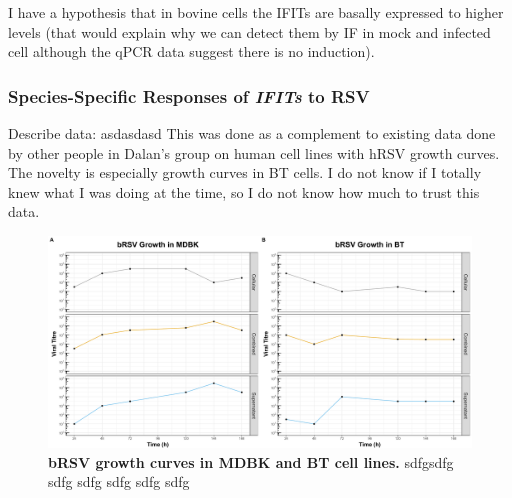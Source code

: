 I have a hypothesis that in bovine cells the IFITs are basally expressed to higher levels  (that would explain why we can detect them by IF in mock and infected cell although the qPCR data suggest there is no induction).











\subsubsection{Species-Specific Responses of \textit{IFITs} to RSV} \label{Species-Specific Responses of IFITs to RSV}

 \label{Growth curves of bovine RSV in bovine cell lines}
Describe data: \newline
asdasdasd \newline
This was done as a complement to existing data done by other people in Dalan’s group on human cell lines with hRSV growth curves. The novelty is especially growth curves in BT cells. I do not know if I totally knew what I was doing at the time, so I do not know how much to trust this data.  

\begin{figure}
    \centering
    \includegraphics[width=1\linewidth]{07. Chapter 2/Figs/01. Technologies/01. growth_curves.pdf}
    \caption[bRSV growth curves in MDBK and BT cell lines.]{\textbf{bRSV growth curves in MDBK and BT cell lines.} sdfgsdfg sdfg sdfg sdfg sdfg sdfg }
    \label{bRSV growth curves in MDBK and BT cell lines}
\end{figure}


